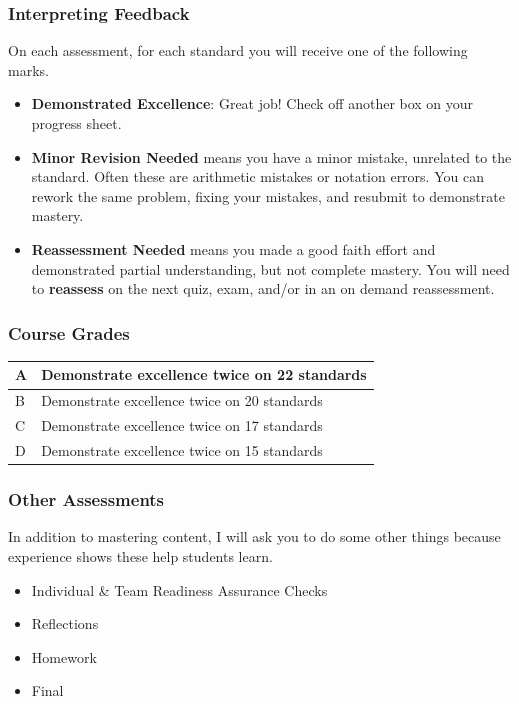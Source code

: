 \documentclass[aspectratio=1610]{beamer}
\begin{document}
\begin{frame}\frametitle{Interpreting Feedback}
On each assessment, for each standard you will receive one of the following marks.
\begin{itemize}
\item {\bf Demonstrated Excellence}: Great job!  Check off another box on your progress sheet.
\item {\bf Minor Revision Needed} means you have a minor mistake, unrelated to the standard. Often these are arithmetic mistakes or notation errors. You can rework the same problem, fixing your mistakes, and resubmit to demonstrate mastery.
\item {\bf Reassessment Needed} means you made a good faith effort and demonstrated
      partial understanding, but not complete mastery. You will need to \textbf{reassess} on the next quiz, exam, and/or in an on demand reassessment.
\end{itemize}

\vspace{0.2in}

\end{frame}




\begin{frame}\frametitle{Course Grades}

\begin{center}
\begin{tabular}{ll} \hline
A & Demonstrate excellence twice on 22 standards\\ \hline
B & Demonstrate excellence twice on 20 standards\\ \hline
C & Demonstrate excellence twice on 17 standards\\ \hline
D & Demonstrate excellence twice on 15 standards\\ \hline
\end{tabular}
\end{center}

\end{frame}


\begin{frame}\frametitle{Other Assessments}
In addition to mastering content, I will ask you to do some other things because experience shows these help students learn.
\begin{itemize}
\item Individual \& Team Readiness Assurance Checks
\item Reflections 
\item Homework
\item Final
\end{itemize}
\end{frame}
\end{document}

